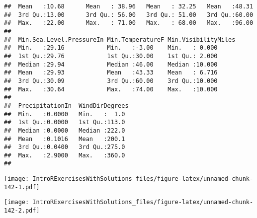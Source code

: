 \documentclass[]{article}
\newenvironment{Shaded}{\begin{snugshade}}{\end{snugshade}}
\newcommand{\KeywordTok}[1]{\textcolor[rgb]{0.13,0.29,0.53}{\textbf{#1}}}
\newcommand{\CommentTok}[1]{\textcolor[rgb]{0.56,0.35,0.01}{\textit{#1}}}
\newcommand{\OperatorTok}[1]{\textcolor[rgb]{0.81,0.36,0.00}{\textbf{#1}}}
\newcommand{\NormalTok}[1]{#1}
\begin{document}
\begin{verbatim}
##  Mean   :10.68      Mean   : 38.96   Mean   : 32.25   Mean   :48.31  
##  3rd Qu.:13.00      3rd Qu.: 56.00   3rd Qu.: 51.00   3rd Qu.:60.00  
##  Max.   :22.00      Max.   : 71.00   Max.   : 68.00   Max.   :96.00  
##                                                                      
##  Min.Sea.Level.PressureIn Min.TemperatureF Min.VisibilityMiles
##  Min.   :29.16            Min.   :-3.00    Min.   : 0.000     
##  1st Qu.:29.76            1st Qu.:30.00    1st Qu.: 2.000     
##  Median :29.94            Median :46.00    Median :10.000     
##  Mean   :29.93            Mean   :43.33    Mean   : 6.716     
##  3rd Qu.:30.09            3rd Qu.:60.00    3rd Qu.:10.000     
##  Max.   :30.64            Max.   :74.00    Max.   :10.000     
##                                                               
##  PrecipitationIn  WindDirDegrees 
##  Min.   :0.0000   Min.   :  1.0  
##  1st Qu.:0.0000   1st Qu.:113.0  
##  Median :0.0000   Median :222.0  
##  Mean   :0.1016   Mean   :200.1  
##  3rd Qu.:0.0400   3rd Qu.:275.0  
##  Max.   :2.9000   Max.   :360.0  
## 
\end{verbatim}

\begin{Shaded}
\end{Shaded}

\texttt{[image: IntroRExercisesWithSolutions\_files/figure-latex/unnamed-chunk-142-1.pdf]}

\begin{Shaded}
\end{Shaded}

\texttt{[image: IntroRExercisesWithSolutions\_files/figure-latex/unnamed-chunk-142-2.pdf]}

\begin{Shaded}
\end{Shaded}
\end{document}
